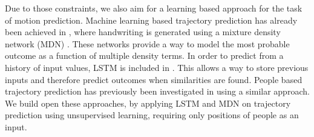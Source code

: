 Due to those constraints, we also aim for a learning based approach for the task of motion prediction.
Machine learning based trajectory prediction has already been achieved in \cite{graves2013generating}, where handwriting is generated using a mixture density network (MDN) \cite{bishop1994mixture}. 
These networks provide a way to model the most probable outcome as a function of multiple density terms. 
In order to predict from a history of input values, LSTM is included in \cite{hochreiter1997long}. 
This allows a way to store previous inputs and therefore predict outcomes when similarities are found. 
People based trajectory prediction has previously been investigated in \cite{alahi2016social} using a similar approach.
We build open these approaches, by applying LSTM and MDN on trajectory prediction using unsupervised learning, requiring only positions of people as an input.